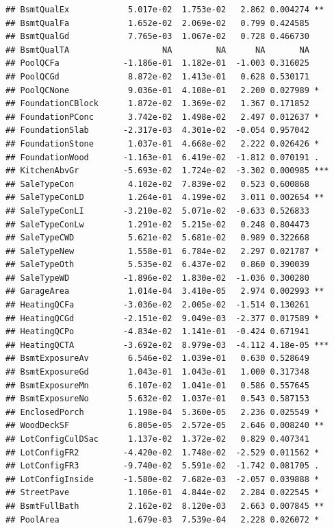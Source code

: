 \documentclass[american,]{article}
\theoremstyle{definition}
\theoremstyle{definition}
\theoremstyle{definition}
\theoremstyle{remark}
\begin{document}
\begin{verbatim}
## BsmtQualEx            5.017e-02  1.753e-02   2.862 0.004274 ** 
## BsmtQualFa            1.652e-02  2.069e-02   0.799 0.424585    
## BsmtQualGd            7.765e-03  1.067e-02   0.728 0.466730    
## BsmtQualTA                   NA         NA      NA       NA    
## PoolQCFa             -1.186e-01  1.182e-01  -1.003 0.316025    
## PoolQCGd              8.872e-02  1.413e-01   0.628 0.530171    
## PoolQCNone            9.036e-01  4.108e-01   2.200 0.027989 *  
## FoundationCBlock      1.872e-02  1.369e-02   1.367 0.171852    
## FoundationPConc       3.742e-02  1.498e-02   2.497 0.012637 *  
## FoundationSlab       -2.317e-03  4.301e-02  -0.054 0.957042    
## FoundationStone       1.037e-01  4.668e-02   2.222 0.026426 *  
## FoundationWood       -1.163e-01  6.419e-02  -1.812 0.070191 .  
## KitchenAbvGr         -5.693e-02  1.724e-02  -3.302 0.000985 ***
## SaleTypeCon           4.102e-02  7.839e-02   0.523 0.600868    
## SaleTypeConLD         1.264e-01  4.199e-02   3.011 0.002654 ** 
## SaleTypeConLI        -3.210e-02  5.071e-02  -0.633 0.526833    
## SaleTypeConLw         1.291e-02  5.215e-02   0.248 0.804473    
## SaleTypeCWD           5.621e-02  5.681e-02   0.989 0.322668    
## SaleTypeNew           1.558e-01  6.784e-02   2.297 0.021787 *  
## SaleTypeOth           5.535e-02  6.437e-02   0.860 0.390039    
## SaleTypeWD           -1.896e-02  1.830e-02  -1.036 0.300280    
## GarageArea            1.014e-04  3.410e-05   2.974 0.002993 ** 
## HeatingQCFa          -3.036e-02  2.005e-02  -1.514 0.130261    
## HeatingQCGd          -2.151e-02  9.049e-03  -2.377 0.017589 *  
## HeatingQCPo          -4.834e-02  1.141e-01  -0.424 0.671941    
## HeatingQCTA          -3.692e-02  8.979e-03  -4.112 4.18e-05 ***
## BsmtExposureAv        6.546e-02  1.039e-01   0.630 0.528649    
## BsmtExposureGd        1.043e-01  1.043e-01   1.000 0.317348    
## BsmtExposureMn        6.107e-02  1.041e-01   0.586 0.557645    
## BsmtExposureNo        5.632e-02  1.037e-01   0.543 0.587153    
## EnclosedPorch         1.198e-04  5.360e-05   2.236 0.025549 *  
## WoodDeckSF            6.805e-05  2.572e-05   2.646 0.008240 ** 
## LotConfigCulDSac      1.137e-02  1.372e-02   0.829 0.407341    
## LotConfigFR2         -4.420e-02  1.748e-02  -2.529 0.011562 *  
## LotConfigFR3         -9.740e-02  5.591e-02  -1.742 0.081705 .  
## LotConfigInside      -1.580e-02  7.682e-03  -2.057 0.039888 *  
## StreetPave            1.106e-01  4.844e-02   2.284 0.022545 *  
## BsmtFullBath          2.162e-02  8.120e-03   2.663 0.007845 ** 
## PoolArea              1.679e-03  7.539e-04   2.228 0.026072 *  

\end{verbatim}
\end{document}
